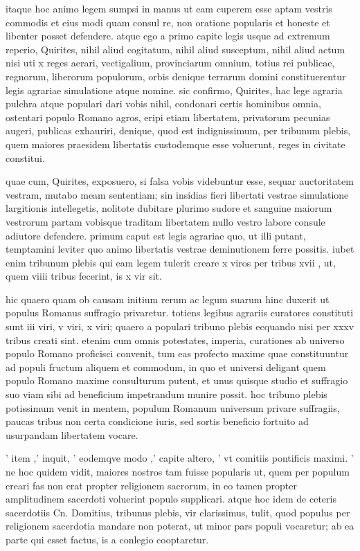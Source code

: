  itaque hoc animo legem sumpsi in manus ut eam cuperem esse aptam vestris commodis et eius modi quam consul re, non oratione popularis et honeste et libenter posset defendere. atque ego a primo capite legis usque ad extremum reperio, Quirites, nihil aliud cogitatum, nihil aliud susceptum, nihil aliud actum nisi uti x reges aerari, vectigalium, provinciarum omnium, totius rei publicae, regnorum, liberorum populorum, orbis denique terrarum domini constituerentur legis agrariae simulatione atque nomine. sic confirmo, Quirites, hac lege agraria pulchra atque populari dari vobis nihil, condonari certis hominibus omnia, ostentari populo Romano agros, eripi etiam libertatem, privatorum pecunias augeri, publicas exhauriri, denique, quod est indignissimum, per tribunum plebis, quem maiores praesidem libertatis custodemque esse voluerunt, reges in civitate constitui.

 quae cum, Quirites, exposuero, si falsa vobis videbuntur esse, sequar auctoritatem vestram, mutabo meam sententiam; sin insidias fieri libertati vestrae simulatione largitionis intellegetis, nolitote dubitare plurimo sudore et sanguine maiorum vestrorum partam vobisque traditam libertatem nullo vestro labore consule adiutore defendere. primum caput est legis agrariae quo, ut illi putant, temptamini leviter quo animo libertatis vestrae deminutionem ferre possitis. iubet enim tribunum plebis qui eam legem tulerit creare x viros per tribus xvii , ut, quem viiii tribus fecerint, is x vir sit.

 hic quaero quam ob causam initium rerum ac legum suarum hinc duxerit ut populus Romanus suffragio privaretur. totiens legibus agrariis curatores constituti sunt iii viri, v viri, x viri; quaero a populari tribuno plebis ecquando nisi per xxxv tribus creati sint. etenim cum omnis potestates, imperia, curationes ab universo populo Romano proficisci convenit, tum eas profecto maxime quae constituuntur ad populi fructum aliquem et commodum, in quo et universi deligant quem populo Romano maxime consulturum putent, et unus quisque studio et suffragio suo viam sibi ad beneficium impetrandum munire possit. hoc tribuno plebis potissimum venit in mentem, populum Romanum universum privare suffragiis, paucas tribus non certa condicione iuris, sed sortis beneficio fortuito ad usurpandam libertatem vocare.

 ' item ,' inquit, ' eodemqve modo ,' capite altero, ' vt comitiis pontificis maximi. ' ne hoc quidem vidit, maiores nostros tam fuisse popularis ut, quem per populum creari fas non erat propter religionem sacrorum, in eo tamen propter amplitudinem sacerdoti voluerint populo supplicari. atque hoc idem de ceteris sacerdotiis Cn. Domitius, tribunus plebis, vir clarissimus, tulit, quod populus per religionem sacerdotia mandare non poterat, ut minor pars populi vocaretur; ab ea parte qui esset factus, is a conlegio cooptaretur.

